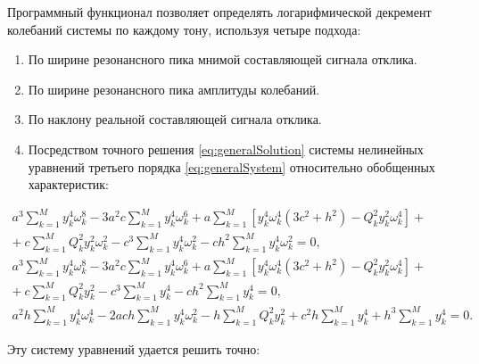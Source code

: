 Программный функционал позволяет определять логарифмической декремент колебаний системы по каждому тону, используя четыре подхода:
\begin{enumerate}[topsep=0pt, noitemsep]
	\item По ширине резонансного пика мнимой составляющей сигнала отклика.
	\item По ширине резонансного пика амплитуды колебаний.
	\item По наклону реальной составляющей сигнала отклика.
	\item Посредством точного решения \eqref{eq:generalSolution} системы нелинейных уравнений третьего порядка \eqref{eq:generalSystem} относительно обобщенных характеристик:
\end{enumerate}

\begin{equation}
	\begin{aligned}
		a ^ 3 \sum_{k = 1} ^ M y_k ^ 4 \omega_k ^ 8 - 3 a ^ 2 c \sum_{k = 1} ^ M y_k ^ 4 \omega_k ^ 6 + a \sum_{k = 1} ^ M \left[ y_k ^ 4 \omega_k ^ 4 \left(3 c ^ 2 + h ^ 2 \right) - Q_k ^ 2 y_k ^ 2 \omega_k ^ 4 \right] + \\
		+ \ c \sum_{k = 1} ^ M Q_k ^ 2 y_k ^ 2 \omega_k ^ 2 - c ^ 3 \sum_{k = 1} ^ M y_k ^ 4 \omega_k ^ 2 - c h ^ 2 \sum_{k = 1} ^ M y_k ^ 4 \omega_k ^ 2 = 0, \\
		a ^ 3 \sum_{k = 1} ^ M y_k ^ 4 \omega_k ^ 8 - 3 a ^ 2 c \sum_{k = 1} ^ M y_k ^ 4 \omega_k ^ 6 + a \sum_{k = 1} ^ M \left[ y_k ^ 4 \omega_k ^ 4 \left(3 c ^ 2 + h ^ 2 \right) - Q_k ^ 2 y_k ^ 2 \omega_k ^ 4 \right] + \\
		+ \ c \sum_{k = 1} ^ M Q_k ^ 2 y_k ^ 2 - c ^ 3 \sum_{k = 1} ^ M y_k ^ 4 - c h ^ 2 \sum_{k = 1} ^ M y_k ^ 4 = 0, \\
		a ^ 2 h \sum_{k = 1} ^ M y_k ^ 4 \omega_k ^ 4 - 2 a c h \sum_{k = 1} ^ M y_k ^ 4 \omega_k ^ 2 - h \sum_{k = 1} ^ M Q_k ^ 2 y_k ^ 2 + c ^ 2 h \sum_{k = 1} ^ M y_k ^ 4 + h ^ 3 \sum_{k = 1} ^ M y_k ^ 4 = 0. 
	\end{aligned}
	\label{eq:generalSystem}
\end{equation}

Эту систему уравнений удается решить точно:


